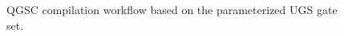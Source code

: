 \begin{figure}[!tp]\centering
\resizebox{.94\linewidth}{!}{}
\par\vspace{4pt}
\caption{QGSC compilation workflow based on the parameterized UGS gate set.}\label{fig:6}
\end{figure}
